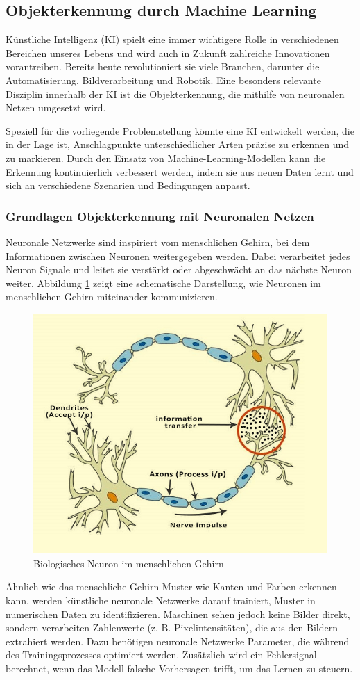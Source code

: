 \subsection{Objekterkennung durch Machine Learning}
Künstliche Intelligenz (KI) spielt eine immer wichtigere Rolle in verschiedenen Bereichen 
unseres Lebens und wird auch in Zukunft zahlreiche Innovationen vorantreiben. 
Bereits heute revolutioniert sie viele Branchen, darunter die Automatisierung, 
Bildverarbeitung und Robotik. Eine besonders relevante Disziplin innerhalb der KI ist die 
Objekterkennung, die mithilfe von neuronalen Netzen umgesetzt wird.

Speziell für die vorliegende Problemstellung könnte eine KI entwickelt werden, die in der 
Lage ist, Anschlagpunkte unterschiedlicher Arten präzise zu erkennen und zu markieren. 
Durch den Einsatz von Machine-Learning-Modellen kann die Erkennung kontinuierlich verbessert 
werden, indem sie aus neuen Daten lernt und sich an verschiedene Szenarien und Bedingungen 
anpasst.

\subsubsection{Grundlagen Objekterkennung mit Neuronalen Netzen}
Neuronale Netzwerke sind inspiriert vom menschlichen Gehirn, bei dem Informationen zwischen Neuronen weitergegeben 
werden. Dabei verarbeitet jedes Neuron Signale und leitet sie verstärkt oder abgeschwächt an das nächste Neuron weiter.
Abbildung \ref{fig:humanCell} zeigt eine schematische Darstellung, wie Neuronen im menschlichen Gehirn miteinander 
kommunizieren.

\begin{figure}[H]
    \centering
    \includegraphics[width=0.4\linewidth]{graphics/human_model.png}
    \caption{Biologisches Neuron im menschlichen Gehirn}
    \label{fig:humanCell}
\end{figure}

Ähnlich wie das menschliche Gehirn Muster wie Kanten und Farben erkennen kann, werden künstliche neuronale Netzwerke 
darauf trainiert, Muster in numerischen Daten zu identifizieren. Maschinen sehen jedoch keine Bilder direkt, sondern 
verarbeiten Zahlenwerte (z. B. Pixelintensitäten), die aus den Bildern extrahiert werden. Dazu benötigen neuronale 
Netzwerke Parameter, die während des Trainingsprozesses optimiert werden. Zusätzlich wird ein Fehlersignal berechnet, 
wenn das Modell falsche Vorhersagen trifft, um das Lernen zu steuern.

